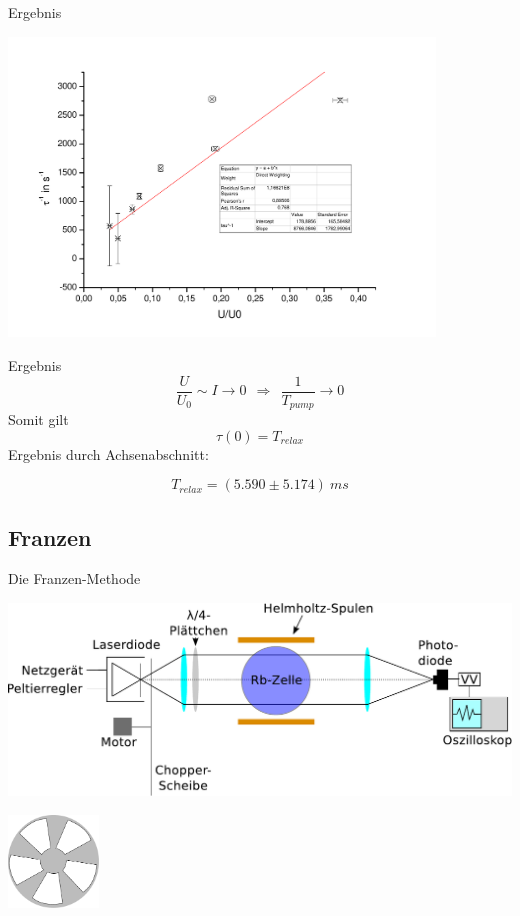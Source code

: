 \documentclass{beamer}
\begin{document}
\begin{frame}{Ergebnis}
\begin{center}
\centering \includegraphics[width=0.85\textwidth]{Bilder/Dehmelt.pdf}
\end{center}
\end{frame}

\begin{frame}{Ergebnis}
$$\frac{U}{U_0} \sim I \to 0 \ \ \Rightarrow \ \ \frac{1}{T_{pump}} \to 0$$
Somit gilt $$\tau(0) = T_{relax}$$
Ergebnis durch Achsenabschnitt:

$$ T_{relax} = (5.590 \pm 5.174)\ ms$$ %

\end{frame}

\subsection{Franzen}
\begin{frame}{Die Franzen-Methode}
\begin{center}
\centering \includegraphics[width=\textwidth]{Bilder/ABFranzen.pdf}

\centering \includegraphics[width=0.18\textwidth]{Bilder/chopper.pdf}
\end{center}
\end{frame}
\end{document}
